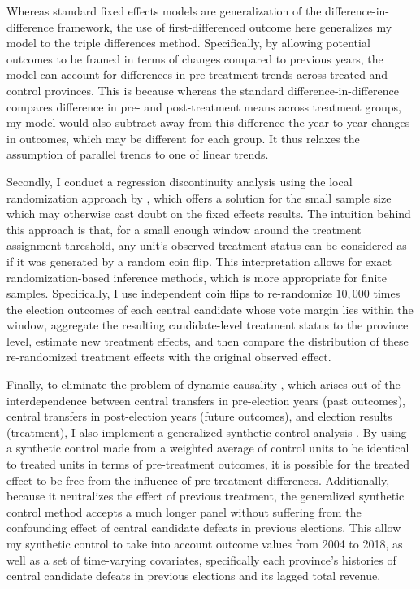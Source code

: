 \documentclass[12pt]{article}
\newcommand{\1}{\mathbbm{1}}
\begin{document}
Whereas standard fixed effects models are generalization of the difference-in-difference framework, the use of first-differenced outcome here generalizes my model to the triple differences method. Specifically, by allowing potential outcomes to be framed in terms of changes compared to previous years, the model can account for differences in pre-treatment trends across treated and control provinces. This is because whereas the standard difference-in-difference compares difference in pre- and post-treatment means across treatment groups, my model would also subtract away from this difference the year-to-year changes in outcomes, which may be different for each group. It thus relaxes the assumption of parallel trends to one of linear trends.

Secondly, I conduct a regression discontinuity analysis using the local randomization approach by \citet{CattaneoTitiunik2015}, which offers a solution for the small sample size which may otherwise cast doubt on the fixed effects results. The intuition behind this approach is that, for a small enough window around the treatment assignment threshold, any unit's observed treatment status can be considered as if it was generated by a random coin flip. This interpretation allows for exact randomization-based inference methods, which is more appropriate for finite samples. Specifically, I use independent coin flips to re-randomize $10,000$ times the election outcomes of each central candidate whose vote margin lies within the window, aggregate the resulting candidate-level treatment status to the province level, estimate new treatment effects, and then compare  the distribution of these re-randomized treatment effects with the original observed effect.

Finally, to eliminate the problem of dynamic causality \citep{ImaiKim2019}, which arises out of the interdependence between central transfers in pre-election years (past outcomes), central transfers in post-election years (future outcomes), and election results (treatment), I also implement a generalized synthetic control analysis \citep{Xu2017gsynth}. By using a synthetic control made from a weighted average of control units to be identical to treated units in terms of pre-treatment outcomes, it is possible for the treated effect to be free from the influence of pre-treatment differences. Additionally, because it neutralizes the effect of previous treatment, the generalized synthetic control method accepts a much longer panel without suffering from the confounding effect of central candidate defeats in previous elections. This allow my synthetic control to take into account outcome values from 2004 to 2018, as well as a set of time-varying covariates, specifically each province's histories of central candidate defeats in previous elections and its lagged total revenue.
\end{document}
